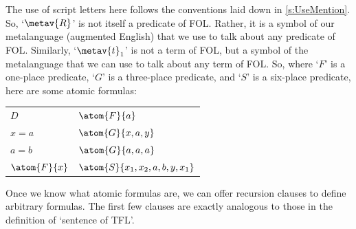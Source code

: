 The use of script letters here follows the conventions laid down in \cref{s:UseMention}. So, `$\metav{R}$' is not itself a predicate of FOL. Rather, it is a symbol of our metalanguage (augmented English) that we use to talk about any predicate of FOL. Similarly, `$\metav{t}_1$' is not a term of FOL, but a symbol of the metalanguage that we can use to talk about any term of FOL. So, where `$F$' is a one-place predicate, `$G$' is a three-place predicate, and `$S$' is a six-place predicate, here are some atomic formulas:
	\begin{center}
		\begin{tabular}{l@{\qquad\qquad}l}
		$D$ & $\atom{F}{a}$\\
		$x = a$ & $\atom{G}{x,a,y}$\\
		$a = b$ & $\atom{G}{a,a,a}$\\
		$\atom{F}{x}$ & $\atom{S}{x_1, x_2, a, b, y, x_1}$
	\end{tabular}
\end{center}
Once we know what atomic formulas are, we can offer recursion clauses to define arbitrary formulas. The first few clauses are exactly analogous to those in the definition of `sentence of TFL'.
